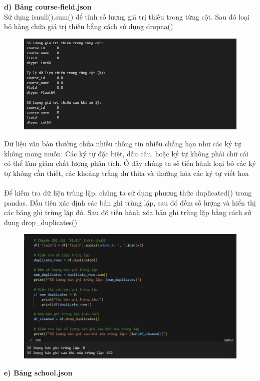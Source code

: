 \textbf{d) Bảng course-field.json}\\
Sử dụng isnull().sum() để tính số lượng giá trị thiếu trong từng cột. Sau đó loại bỏ hàng chứa giá trị thiếu bằng cách sử dụng dropna()
\newpage
\begin{figure}
    \centering
    \includegraphics[width=1\linewidth]{figures/48.png}
\end{figure}
Dữ liệu văn bản thường chứa nhiều thông tin nhiễu chẳng hạn như các ký tự không mong muốn: Các ký tự đặc biệt, dấu câu, hoặc ký tự không phải chữ cái có thể làm giảm chất lượng phân tích. Ở đây chúng ta sẽ tiến hành loại bỏ các ký tự không cần thiết, các khoảng trắng dư thừa và thường hóa các ký tự viết hoa\\
\\
Để kiếm tra dữ liệu trùng lặp, chúng ta sử dụng phương thức duplicated() trong pandas. Đầu tiên xác định các bản ghi trùng lặp, sau đó đếm số lượng và hiển thị các bảng ghi trùng lặp đó. Sau đó tiến hành xóa bản ghi trùng lặp bằng cách sử dụng drop\_duplicates()
\newpage
\begin{figure}
    \centering
    \includegraphics[width=1\linewidth]{figures/49.png}
\end{figure}
\textbf{e) Bảng school.json}\\
